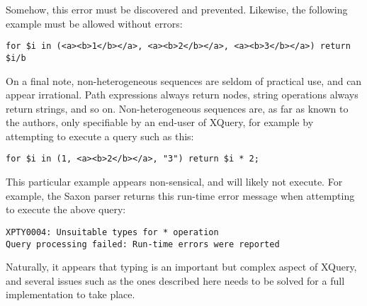 Somehow, this error must be discovered and prevented. Likewise, the following
example must be allowed without errors:

\begin{Verbatim}
for $i in (<a><b>1</b></a>, <a><b>2</b></a>, <a><b>3</b></a>) return $i/b
\end{Verbatim}

On a final note, non-heterogeneous sequences are seldom of practical use, and
can appear irrational. Path expressions always return nodes, string operations
always return strings, and so on. Non-heterogeneous sequences are, as far as
known to the authors, only specifiable by an end-user of XQuery, for example by
attempting to execute a query such as this:

\begin{Verbatim}
for $i in (1, <a><b>2</b></a>, "3") return $i * 2;
\end{Verbatim}

This particular example appears non-sensical, and will likely not execute. For
example, the Saxon parser returns this run-time error message when attempting
to execute the above query:

\begin{Verbatim}
XPTY0004: Unsuitable types for * operation
Query processing failed: Run-time errors were reported
\end{Verbatim}

Naturally, it appears that typing is an important but complex aspect of XQuery,
and several issues such as the ones described here needs to be solved for a
full implementation to take place.

